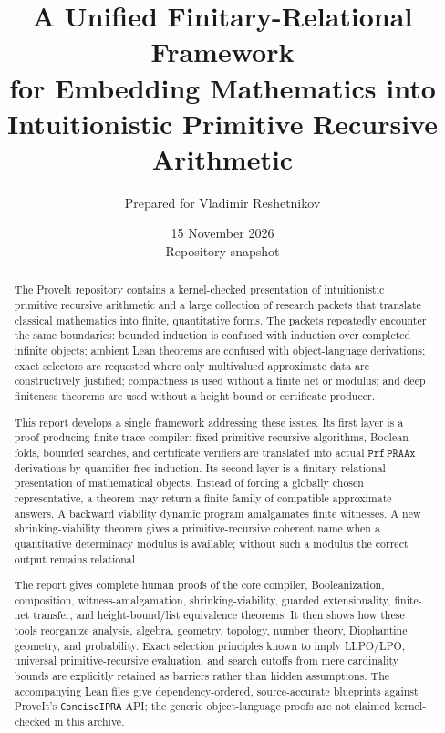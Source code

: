 \documentclass[11pt]{article}
\title{\textbf{A Unified Finitary-Relational Framework\\for Embedding Mathematics into Intuitionistic Primitive Recursive Arithmetic}}
\author{Prepared for Vladimir Reshetnikov}
\date{15 November 2026\\Repository snapshot \code{b88e843c31b50dfe461bfbd0380166ca422cd3ab}}
\theoremstyle{remark}
\newcommand{\PRAAx}{\texttt{PRAAx}}
\newcommand{\Prf}{\texttt{Prf}}
\newcommand{\code}[1]{\texttt{#1}}
\begin{document}
\maketitle

\begin{abstract}
The ProveIt repository contains a kernel-checked presentation of intuitionistic
primitive recursive arithmetic and a large collection of research packets that
translate classical mathematics into finite, quantitative forms.  The packets
repeatedly encounter the same boundaries: bounded induction is confused with
induction over completed infinite objects; ambient Lean theorems are confused
with object-language derivations; exact selectors are requested where only
multivalued approximate data are constructively justified; compactness is used
without a finite net or modulus; and deep finiteness theorems are used without
a height bound or certificate producer.

This report develops a single framework addressing these issues.  Its first
layer is a proof-producing finite-trace compiler: fixed primitive-recursive
algorithms, Boolean folds, bounded searches, and certificate verifiers are
translated into actual \(\Prf\,\PRAAx\) derivations by quantifier-free induction.
Its second layer is a finitary relational presentation of mathematical objects.
Instead of forcing a globally chosen representative, a theorem may return a
finite family of compatible approximate answers.  A backward viability dynamic
program amalgamates finite witnesses.  A new shrinking-viability theorem gives
a primitive-recursive coherent name when a quantitative determinacy modulus is
available; without such a modulus the correct output remains relational.

The report gives complete human proofs of the core compiler, Booleanization,
composition, witness-amalgamation, shrinking-viability, guarded extensionality,
finite-net transfer, and height-bound/list equivalence theorems.  It then shows
how these tools reorganize analysis, algebra, geometry, topology, number theory,
Diophantine geometry, and probability.  Exact selection principles known to
imply LLPO/LPO, universal primitive-recursive evaluation, and search cutoffs
from mere cardinality bounds are explicitly retained as barriers rather than
hidden assumptions.  The accompanying Lean files give dependency-ordered,
source-accurate blueprints against ProveIt's \code{ConciseIPRA} API; the generic
object-language proofs are not claimed kernel-checked in this archive.
\end{abstract}

\tableofcontents
\newpage



















\end{document}
